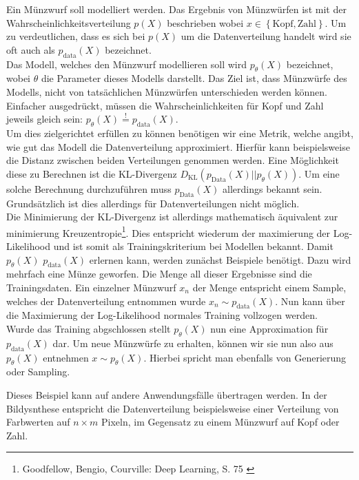 Ein Münzwurf soll modelliert werden. Das Ergebnis von Münzwürfen ist mit der Wahrscheinlichkeitsverteilung $p(X)$ beschrieben wobei $x \in \left \{ \text{Kopf}, \text{Zahl} \right \}$. Um zu verdeutlichen, dass es sich bei $p(X)$ um die Datenverteilung handelt wird sie oft auch als $p_\text{data}(X)$ bezeichnet. \\
Das Modell, welches den Münzwurf modellieren soll wird $p_\theta(X)$ bezeichnet, wobei $\theta$ die Parameter dieses Modells darstellt. Das Ziel ist, dass Münzwürfe des Modells, nicht von tatsächlichen Münzwürfen unterschieden werden können. Einfacher ausgedrückt, müssen die Wahrscheinlichkeiten für Kopf und Zahl jeweils gleich sein: $p_\theta(X) \overset{!}{=} p_\text{data}(X)$. \\ 
Um dies zielgerichtet erfüllen zu können benötigen wir eine Metrik, welche angibt, wie gut das Modell die Datenverteilung approximiert. Hierfür kann beispielsweise die Distanz zwischen beiden Verteilungen genommen werden. Eine Möglichkeit diese zu Berechnen ist die KL-Divergenz $D_\text{KL}(p_\text{Data}(X)||p_\theta(X))$. Um eine solche Berechnung durchzuführen muss $p_\text{Data}(X)$ allerdings bekannt sein. Grundsätzlich ist dies allerdings für Datenverteilungen nicht möglich. \\
Die Minimierung der KL-Divergenz ist allerdings mathematisch äquivalent zur minimierung Kreuzentropie\footnote{
    Goodfellow, Bengio, Courville: Deep Learning, S. 75
    \cite{Goodfellow-et-al-2016}
}. 
Dies entspricht wiederum der maximierung der Log-Likelihood und ist somit als Trainingskriterium bei Modellen bekannt.
Damit $p_\theta(X)$ $p_\text{data}(X)$ erlernen kann, werden zunächst Beispiele benötigt. Dazu wird mehrfach eine Münze geworfen. Die Menge all dieser Ergebnisse sind die Trainingsdaten. Ein einzelner Münzwurf $x_n$ der Menge entspricht einem Sample, welches der Datenverteilung entnommen wurde $x_n \sim p_\text{data}(X)$. Nun kann über die Maximierung der Log-Likelihood normales Training vollzogen werden. \\
Wurde das Training abgschlossen stellt $p_\theta(X)$ nun eine Approximation für $p_\text{data}(X)$ dar. Um neue Münzwürfe zu erhalten, können wir sie nun also aus $p_\theta(X)$ entnehmen $x \sim p_\theta(X)$. Hierbei spricht man ebenfalls von Generierung oder Sampling.

Dieses Beispiel kann auf andere Anwendungsfälle übertragen werden. In der Bildysnthese entspricht die Datenverteilung beispielsweise einer Verteilung von Farbwerten auf $n \times m$ Pixeln, im Gegensatz zu einem Münzwurf auf Kopf oder Zahl.

